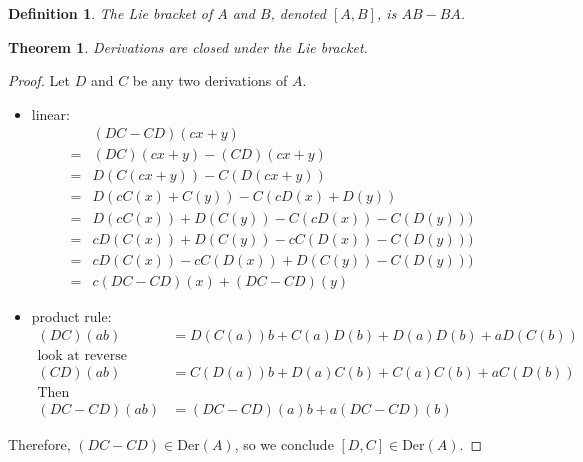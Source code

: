 \documentclass[11pt]{amsbook}
\theoremstyle{mystyle} \newtheorem{thrm}[thm]{Theorem}
\theoremstyle{mystyle} \newtheorem{defi}[thm]{Definition}
\theoremstyle{mystyle} \newtheorem{coro}[thm]{Corollary}
\theoremstyle{mystyle} \newtheorem{propo}[thm]{Proposition}
\theoremstyle{mystyle} \newtheorem{lemm}[thm]{Lemma}
\numberwithin{thm}{section}
\newcommand{\Der}{\text{Der}}
\newcommand{\de}{\emph}
\begin{document}
\begin{defi}
	The \de{Lie bracket} of $A$ and $B$, denoted $[A,B]$, is $AB - BA$.
\end{defi}
\begin{thrm}
	Derivations are closed under the Lie bracket.
\end{thrm}
\begin{proof}
	Let $D$ and $C$ be any two derivations of $A$.
	\begin{itemize}
		\item linear:
		\begin{align}
			& (DC - CD)(cx + y) \\
			=& (DC)(cx + y) - (CD)(cx + y) \\
			=& D(C(cx + y)) - C(D(cx + y)) \\
			=& D(cC(x) + C(y)) - C(cD(x) + D(y)) \\
			=& D(cC(x)) + D(C(y)) - C(cD(x)) - C(D(y))) \\
			=& cD(C(x)) + D(C(y)) - cC(D(x)) - C(D(y))) \\
			=& cD(C(x)) - cC(D(x))+  D(C(y)) - C(D(y))) \\
			=& c(DC-CD)(x)      +    (DC-CD)(y)
		\end{align}
		\item product rule:
		\begin{align}
			(DC)(ab) &= D(C(a))b + C(a)D(b) + D(a)D(b) + aD(C(b)) \\
			\text{look at reverse} \\
			(CD)(ab) &= C(D(a))b + D(a)C(b) + C(a)C(b) + aC(D(b)) \\
			\text{Then} \\
			(DC - CD)(ab) &= (DC - CD)(a)b + a(DC - CD)(b)
		\end{align}
	\end{itemize}
	Therefore,  $(DC - CD) \in \Der(A)$, so we conclude $[D,C] \in \Der(A)$.
\end{proof}
\end{document}

